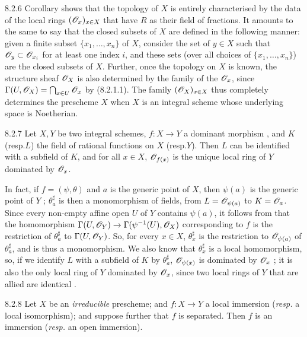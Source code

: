 \begin{env}{8.2.6}
\label{env-1.8.2.6}
Corollary  shows that the topology of $X$ is
entirely characterised by the data of the local rings $(\mathscr{O}_x)_{x\in X}$ that
have $R$ as their field of fractions. It amounts to the same to say that the
closed subsets of $X$ are defined in the following manner: given a finite subset
$\{x_1,\ldots,x_n\}$ of $X$, consider the set of $y\in X$ such that
$\mathscr{O}_y\subset\mathscr{O}_{x_i}$ for at least one index $i$, and these sets (over all
choices of $\{x_1,\ldots,x_n\}$) are the closed subsets of $X$. Further, once
the topology on $X$ is known, the structure sheaf $\mathscr{O}_X$ is also determined by
the family of the $\mathscr{O}_x$, since $\Gamma(U,\mathscr{O}_X)=\bigcap_{x\in U}\mathscr{O}_x$ by
(8.2.1.1). The family $(\mathscr{O}_X)_{x\in X}$ thus completely determines the
prescheme $X$ when $X$ is an integral scheme whose underlying space is
Noetherian.
\end{env}

\begin{envs}[Proposition]{8.2.7}
\label{prop-1.8.2.7}
Let $X,Y$ be two integral schemes, $f:X\to Y$ a dominant morphism
, and $K$ (resp.$L$) the field of rational
functions on $X$ (resp.$Y$). Then $L$ can be identified with a subfield of
$K$, and for all $x\in X$, $\mathscr{O}_{f(x)}$ is the unique local ring of $Y$ dominated
by $\mathscr{O}_x$.
\end{envs}

In fact, if $f=(\psi,\theta)$ and $a$ is the generic point of $X$, then
$\psi(a)$ is the generic point of $Y$ ; $\theta_a^\sharp$ is then
a monomorphism of fields, from $L=\mathscr{O}_{\psi(a)}$ to $K=\mathscr{O}_a$. Since every
non-empty affine open $U$ of $Y$ contains $\psi(a)$, it follows from
 that the homomorphism $\Gamma(U,\mathscr{O}_Y)\to\Gamma(\psi^{-1}(U),\mathscr{O}_X)$
corresponding to $f$ is the restriction of $\theta_a^\sharp$ to $\Gamma(U,\mathscr{O}_Y)$.
So, for every $x\in X$, $\theta_x^\sharp$ is the restriction to $\mathscr{O}_{\psi(a)}$ of
$\theta_a^\sharp$, and is thus a monomorphism. We also know that $\theta_x^\sharp$ is a
local homomorphism, so, if we identify $L$ with a subfield of $K$ by
$\theta_a^\sharp$, $\mathscr{O}_{\psi(x)}$ is dominated by $\mathscr{O}_x$ ; it is also
the only local ring of $Y$ dominated by $\mathscr{O}_x$, since two local rings of $Y$
that are allied are identical .

\begin{envs}[Proposition]{8.2.8}
\label{prop-1.8.2.8}
Let $X$ be an \emph{irreducible} prescheme; and
$f:X\to Y$ a local immersion (\emph{resp.} a local isomorphism); and
suppose further that $f$ is separated. Then $f$ is an immersion (\emph{resp.}
an open immersion).
\end{envs}


